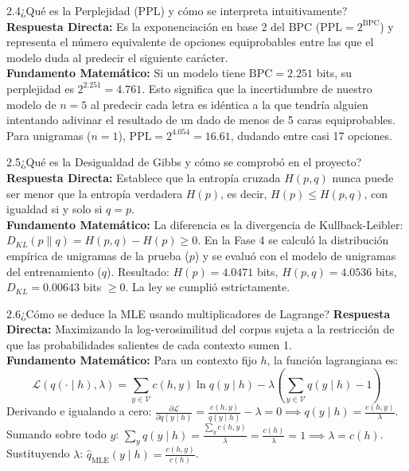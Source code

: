 \documentclass[11pt,letterpaper]{article}
\begin{document}
\begin{qbox}{2.4}{¿Qué es la Perplejidad (PPL) y cómo se interpreta intuitivamente?}
\textbf{Respuesta Directa:} Es la exponenciación en base 2 del BPC ($\text{PPL} = 2^{\text{BPC}}$) y representa el número equivalente de opciones equiprobables entre las que el modelo duda al predecir el siguiente carácter.\\[3pt]
\textbf{Fundamento Matemático:} Si un modelo tiene $\text{BPC} = 2.251$ bits, su perplejidad es $2^{2.251} = 4.761$. Esto significa que la incertidumbre de nuestro modelo de $n=5$ al predecir cada letra es idéntica a la que tendría alguien intentando adivinar el resultado de un dado de menos de 5 caras equiprobables. Para unigramas ($n=1$), $\text{PPL} = 2^{4.054} = 16.61$, dudando entre casi 17 opciones.
\end{qbox}

\begin{qbox}{2.5}{¿Qué es la Desigualdad de Gibbs y cómo se comprobó en el proyecto?}
\textbf{Respuesta Directa:} Establece que la entropía cruzada $H(p,q)$ nunca puede ser menor que la entropía verdadera $H(p)$, es decir, $H(p) \le H(p,q)$, con igualdad si y solo si $q = p$.\\[3pt]
\textbf{Fundamento Matemático:} La diferencia es la divergencia de Kullback-Leibler: $D_{KL}(p \parallel q) = H(p,q) - H(p) \ge 0$. En la Fase 4 se calculó la distribución empírica de unigramas de la prueba ($p$) y se evaluó con el modelo de unigramas del entrenamiento ($q$). Resultado: $H(p) = 4.0471$ bits, $H(p,q) = 4.0536$ bits, $D_{KL} = 0.00643$ bits $\ge 0$. La ley se cumplió estrictamente.
\end{qbox}

\begin{qbox}{2.6}{¿Cómo se deduce la MLE usando multiplicadores de Lagrange?}
\textbf{Respuesta Directa:} Maximizando la log-verosimilitud del corpus sujeta a la restricción de que las probabilidades salientes de cada contexto sumen 1.\\[3pt]
\textbf{Fundamento Matemático:} Para un contexto fijo $h$, la función lagrangiana es:
$$\mathcal{L}(q(\cdot \mid h), \lambda) = \sum_{y \in \mathcal{V}} c(h,y) \ln q(y \mid h) - \lambda \left(\sum_{y \in \mathcal{V}} q(y \mid h) - 1\right)$$
Derivando e igualando a cero: $\frac{\partial \mathcal{L}}{\partial q(y \mid h)} = \frac{c(h,y)}{q(y \mid h)} - \lambda = 0 \implies q(y \mid h) = \frac{c(h,y)}{\lambda}$.\\
Sumando sobre todo $y$: $\sum_y q(y \mid h) = \frac{\sum_y c(h,y)}{\lambda} = \frac{c(h)}{\lambda} = 1 \implies \lambda = c(h)$.\\
Sustituyendo $\lambda$: $\hat{q}_{\text{MLE}}(y \mid h) = \frac{c(h,y)}{c(h)}$.
\end{qbox}
\end{document}
